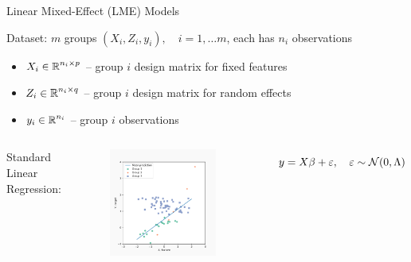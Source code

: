 \documentclass[8pt]{beamer}
\begin{document}
\begin{frame}{Linear Mixed-Effect (LME) Models}

	Dataset: $m$ groups $(X_i, Z_i, y_i),\quad i = 1, \dots m$, each has $n_i$ observations
	\begin{itemize}
		\item 	$X_i \in \operatorname{\mathbb{R}}^{n_i \times p}$ -- group $i$ design matrix for fixed features
		\item 	$Z_i \in \operatorname{\mathbb{R}}^{n_i \times q}$ -- group $i$ design matrix for random effects
		\item 	$y_i \in \operatorname{\mathbb{R}}^{n_i}$ -- group $i$ observations  
	\end{itemize}
	

	\begin{columns}[T,onlytextwidth]
	 \centering Standard Linear Regression:
   	\begin{figure}
   		\includegraphics[width=0.9\textwidth]{Figures/lme_example_mean_prediction}
   	\end{figure}
   	\[
   		y = X\beta + \varepsilon, \quad \varepsilon \sim \operatorname{\mathcal{N}}(0, \Lambda) 
   	\]


\end{columns}
\end{frame}
\end{document}
